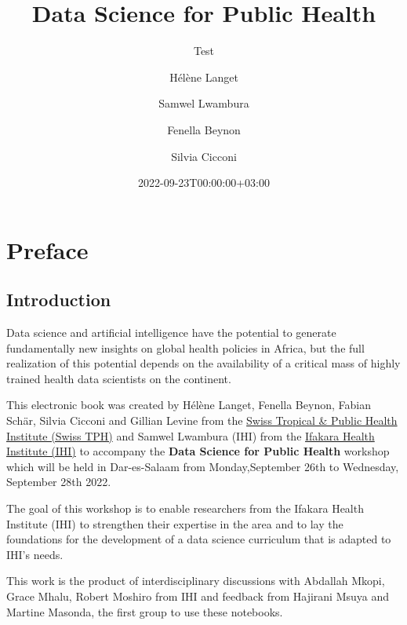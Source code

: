 \documentclass[
  letterpaper,
  DIV=11,
  numbers=noendperiod]{scrreprt}
\title{Data Science for Public Health}
\subtitle{Test}
\author{Hélène Langet \and Samwel Lwambura \and Fenella
Beynon \and Silvia Cicconi}
\date{2022-09-23T00:00:00+03:00}
\renewcommand*\contentsname{Table of contents}
\newcommand\contentsname{Table of contents}
\begin{document}
\maketitle
\ifdefined\Shaded\renewenvironment{Shaded}{\begin{tcolorbox}[interior hidden, enhanced, sharp corners, boxrule=0pt, breakable, frame hidden, borderline west={3pt}{0pt}{shadecolor}]}{\end{tcolorbox}}\fi

\renewcommand*\contentsname{Table of contents}
{
\hypersetup{linkcolor=}
\setcounter{tocdepth}{2}
\tableofcontents
}

\hypertarget{preface}{%
\chapter*{Preface}\label{preface}}

\hypertarget{introduction}{%
\section*{Introduction}\label{introduction}}

Data science and artificial intelligence have the potential to generate
fundamentally new insights on global health policies in Africa, but the
full realization of this potential depends on the availability of a
critical mass of highly trained health data scientists on the continent.

This electronic book was created by Hélène Langet, Fenella Beynon,
Fabian Schär, Silvia Cicconi and Gillian Levine from the
\href{https://www.swisstph.ch}{Swiss Tropical \& Public Health Institute
(Swiss TPH)} and Samwel Lwambura (IHI) from the
\href{https://ihi.or.tz/}{Ifakara Health Institute (IHI)} to accompany
the \textbf{Data Science for Public Health} workshop which will be held
in Dar-es-Salaam from Monday,September 26th to Wednesday, September 28th
2022.

The goal of this workshop is to enable researchers from the Ifakara
Health Institute (IHI) to strengthen their expertise in the area and to
lay the foundations for the development of a data science curriculum
that is adapted to IHI's needs.

This work is the product of interdisciplinary discussions with Abdallah
Mkopi, Grace Mhalu, Robert Moshiro from IHI and feedback from Hajirani
Msuya and Martine Masonda, the first group to use these notebooks.
\end{document}
